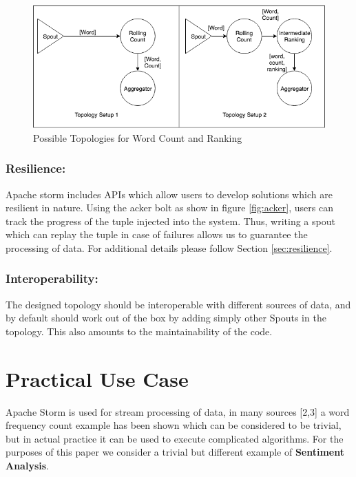 \documentclass[runningheads,a4paper]{llncs}[2015/06/24]
\begin{document}
\begin{figure}
  \begin{center}
    \includegraphics[width=\textwidth]{ranking.png}
    \caption{Possible Topologies for Word Count and Ranking}
    \label{fig:ranking}
   \end{center}
\end{figure}

\subsubsection{Resilience:} Apache storm includes APIs which allow users to develop solutions which are resilient in nature. Using the acker bolt as show in figure \ref{fig:acker}, users can track the progress of the tuple injected into the system. Thus, writing a spout which can replay the tuple in case of failures allows us to guarantee the processing of data. For additional details please follow Section \ref{sec:resilience}.

\subsubsection{Interoperability:} The designed topology should be interoperable with different sources of data, and by default should work out of the box by adding simply other Spouts in the topology. This also amounts to the maintainability of the code.

\section{Practical Use Case}
\label{sec:usecase}
Apache Storm is used for stream processing of data, in many sources [2,3] a word frequency count example has been shown which can be considered to be trivial, but in actual practice it can be used to execute complicated algorithms. For the purposes of this paper we consider a trivial but different example of \textbf{Sentiment Analysis}.
\end{document}
